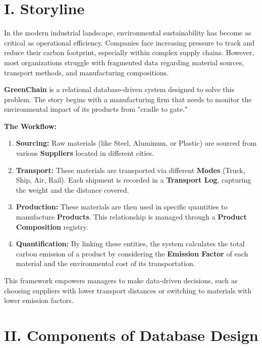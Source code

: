 \documentclass[12pt,a4paper]{article}
\begin{document}
\newpage


\section*{I. Storyline}
In the modern industrial landscape, environmental sustainability has become as critical as operational efficiency. Companies face increasing pressure to track and reduce their carbon footprint, especially within complex supply chains. However, most organizations struggle with fragmented data regarding material sources, transport methods, and manufacturing compositions.

\textbf{GreenChain} is a relational database-driven system designed to solve this problem. The story begins with a manufacturing firm that needs to monitor the environmental impact of its products from "cradle to gate."

\textbf{The Workflow:}
\begin{enumerate}
    \item \textbf{Sourcing:} Raw materials (like Steel, Aluminum, or Plastic) are sourced from various \textbf{Suppliers} located in different cities.
    \item \textbf{Transport:} These materials are transported via different \textbf{Modes} (Truck, Ship, Air, Rail). Each shipment is recorded in a \textbf{Transport Log}, capturing the weight and the distance covered.
    \item \textbf{Production:} These materials are then used in specific quantities to manufacture \textbf{Products}. This relationship is managed through a \textbf{Product Composition} registry.
    \item \textbf{Quantification:} By linking these entities, the system calculates the total carbon emission of a product by considering the \textbf{Emission Factor} of each material and the environmental cost of its transportation.
\end{enumerate}

This framework empowers managers to make data-driven decisions, such as choosing suppliers with lower transport distances or switching to materials with lower emission factors.

\newpage

\section*{II. Components of Database Design}
\end{document}
